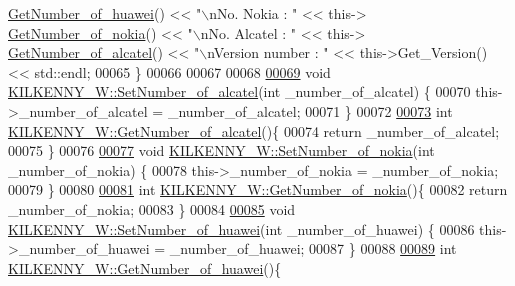 \begin{DoxyCode}
      \hyperlink{class_k_i_l_k_e_n_n_y___w_a0b0689da37856045c9325e6723f78d4b}{GetNumber\_of\_huawei}() << \textcolor{stringliteral}{"\(\backslash\)nNo. Nokia : "} << this->
      \hyperlink{class_k_i_l_k_e_n_n_y___w_ad1e54597be8ac03021520caf851981e4}{GetNumber\_of\_nokia}() << \textcolor{stringliteral}{"\(\backslash\)nNo. Alcatel : "} << this->
      \hyperlink{class_k_i_l_k_e_n_n_y___w_a8f23cfd2feb57a5b67f16d49c137820f}{GetNumber\_of\_alcatel}() << \textcolor{stringliteral}{"\(\backslash\)nVersion number : "} << this->Get\_Version() << std::endl;
00065 \}
00066 
00067 
00068 
\hypertarget{_k_i_l_k_e_n_n_y___w_8cpp_source.tex_l00069}{}\hyperlink{class_k_i_l_k_e_n_n_y___w_ac4c3dbc9e74a4ae6c0a7e88d7a8f80a2}{00069} \textcolor{keywordtype}{void} \hyperlink{class_k_i_l_k_e_n_n_y___w_ac4c3dbc9e74a4ae6c0a7e88d7a8f80a2}{KILKENNY\_W::SetNumber\_of\_alcatel}(\textcolor{keywordtype}{int} \_number\_of\_alcatel) \{
00070     this->\_number\_of\_alcatel = \_number\_of\_alcatel;
00071 \}
00072 
\hypertarget{_k_i_l_k_e_n_n_y___w_8cpp_source.tex_l00073}{}\hyperlink{class_k_i_l_k_e_n_n_y___w_a8f23cfd2feb57a5b67f16d49c137820f}{00073} \textcolor{keywordtype}{int} \hyperlink{class_k_i_l_k_e_n_n_y___w_a8f23cfd2feb57a5b67f16d49c137820f}{KILKENNY\_W::GetNumber\_of\_alcatel}()\{
00074     \textcolor{keywordflow}{return} \_number\_of\_alcatel;
00075 \}
00076 
\hypertarget{_k_i_l_k_e_n_n_y___w_8cpp_source.tex_l00077}{}\hyperlink{class_k_i_l_k_e_n_n_y___w_a3306af7f7a306f5198c6d78e6a54bf8f}{00077} \textcolor{keywordtype}{void} \hyperlink{class_k_i_l_k_e_n_n_y___w_a3306af7f7a306f5198c6d78e6a54bf8f}{KILKENNY\_W::SetNumber\_of\_nokia}(\textcolor{keywordtype}{int} \_number\_of\_nokia) \{
00078     this->\_number\_of\_nokia = \_number\_of\_nokia;
00079 \}
00080 
\hypertarget{_k_i_l_k_e_n_n_y___w_8cpp_source.tex_l00081}{}\hyperlink{class_k_i_l_k_e_n_n_y___w_ad1e54597be8ac03021520caf851981e4}{00081} \textcolor{keywordtype}{int} \hyperlink{class_k_i_l_k_e_n_n_y___w_ad1e54597be8ac03021520caf851981e4}{KILKENNY\_W::GetNumber\_of\_nokia}()\{
00082     \textcolor{keywordflow}{return} \_number\_of\_nokia;
00083 \}
00084 
\hypertarget{_k_i_l_k_e_n_n_y___w_8cpp_source.tex_l00085}{}\hyperlink{class_k_i_l_k_e_n_n_y___w_a2b89e05ada24ce0b7055f2b7cfb76e52}{00085} \textcolor{keywordtype}{void} \hyperlink{class_k_i_l_k_e_n_n_y___w_a2b89e05ada24ce0b7055f2b7cfb76e52}{KILKENNY\_W::SetNumber\_of\_huawei}(\textcolor{keywordtype}{int} \_number\_of\_huawei) \{
00086     this->\_number\_of\_huawei = \_number\_of\_huawei;
00087 \}
00088 
\hypertarget{_k_i_l_k_e_n_n_y___w_8cpp_source.tex_l00089}{}\hyperlink{class_k_i_l_k_e_n_n_y___w_a0b0689da37856045c9325e6723f78d4b}{00089} \textcolor{keywordtype}{int} \hyperlink{class_k_i_l_k_e_n_n_y___w_a0b0689da37856045c9325e6723f78d4b}{KILKENNY\_W::GetNumber\_of\_huawei}()\{

\end{DoxyCode}
